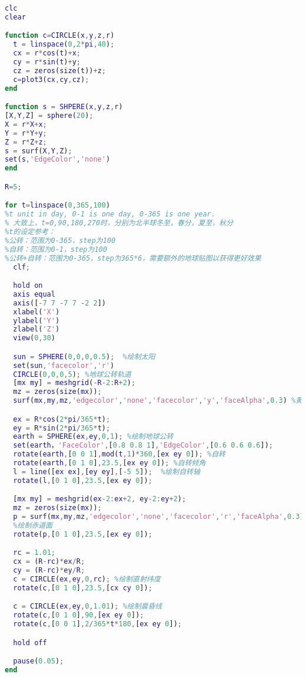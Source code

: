 \begin{lstlisting}[language=matlab]
clc
clear

function c=CIRCLE(x,y,z,r)
  t = linspace(0,2*pi,40);
  cx = r*cos(t)+x;
  cy = r*sin(t)+y;
  cz = zeros(size(t))+z;
  c=plot3(cx,cy,cz);
end

function s = SHPERE(x,y,z,r)
[X,Y,Z] = sphere(20);
X = r*X+x;
Y = r*Y+y;
Z = r*Z+z;
s = surf(X,Y,Z);
set(s,'EdgeColor','none')
end

R=5;

for t=linspace(0,365,100) 
%t unit in day, 0-1 is one day, 0-365 is one year.
% 大致上，t=0,90,180,270时，分别为北半球冬至，春分，夏至，秋分
%t的设定参考：
%公转：范围为0-365，step为100
%自转：范围为0-1，step为100
%公转+自转：范围为0-365，step为365*6，需要额外的地球贴图以获得更好效果
  clf;

  hold on
  axis equal
  axis([-7 7 -7 7 -2 2])
  xlabel('X')
  ylabel('Y')
  zlabel('Z')
  view(0,30)

  sun = SPHERE(0,0,0,0.5);  %绘制太阳
  set(sun,'facecolor','r')
  CIRCLE(0,0,0,5); %地球公转轨道
  [mx my] = meshgrid(-R-2:R+2);
  mz = zeros(size(mx));
  surf(mx,my,mz,'edgecolor','none','facecolor','y','faceAlpha',0.3) %黄道面

  ex = R*cos(2*pi/365*t);
  ey = R*sin(2*pi/365*t);
  earth = SPHERE(ex,ey,0,1); %绘制地球公转
  set(earth，'FaceColor',[0.8 0.8 1],'EdgeColor',[0.6 0.6 0.6]);
  rotate(earth,[0 0 1],mod(t,1)*360,[ex ey 0]); %自转
  rotate(earth,[0 1 0],23.5,[ex ey 0]); %自转倾角
  l = line([ex ex],[ey ey],[-5 5]);  %绘制自转轴
  rotate(l,[0 1 0],23.5,[ex ey 0]);

  [mx my] = meshgrid(ex-2:ex+2, ey-2:ey+2);
  mz = zeros(size(mx));
  p = surf(mx,my,mz,'edgecolor','none','facecolor','r','faceAlpha',0.3);  
  %绘制赤道面
  rotate(p,[0 1 0],23.5,[ex ey 0]);

  rc = 1.01;
  cx = (R-rc)*ex/R;
  cy = (R-rc)*ey/R;
  c = CIRCLE(ex,ey,0,rc); %绘制直射纬度
  rotate(c,[0 1 0],23.5,[cx cy 0]);

  c = CIRCLE(ex,ey,0,1.01); %绘制晨昏线
  rotate(c,[0 1 0],90,[ex ey 0]);
  rotate(c,[0 0 1],2/365*t*180,[ex ey 0]);

  hold off

  pause(0.05);
end


\end{lstlisting}